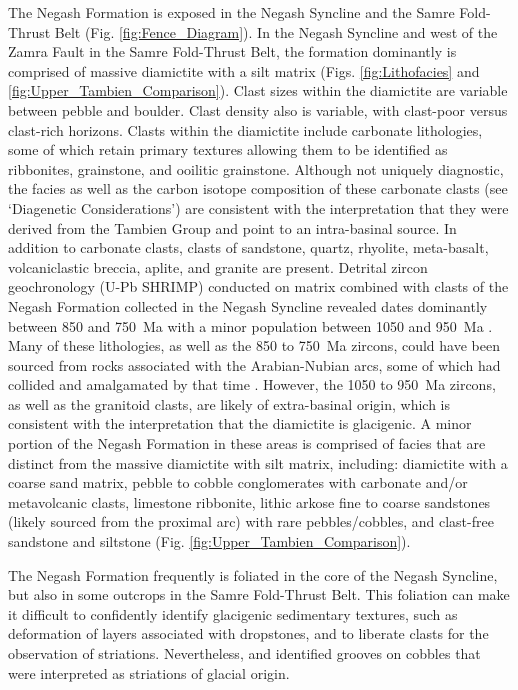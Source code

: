 \documentclass[11pt,letterpaper]{article}
\begin{document}
The Negash Formation is exposed in the Negash Syncline and the Samre Fold-Thrust Belt (Fig. \ref{fig:Fence_Diagram}). In the Negash Syncline and west of the Zamra Fault in the Samre Fold-Thrust Belt, the formation dominantly is comprised of massive diamictite with a silt matrix (Figs. \ref{fig:Lithofacies} and \ref{fig:Upper_Tambien_Comparison}). Clast sizes within the diamictite are variable between pebble and boulder. Clast density also is variable, with clast-poor versus clast-rich horizons. Clasts within the diamictite include carbonate lithologies, some of which retain primary textures allowing them to be identified as ribbonites, grainstone, and ooilitic grainstone. Although not uniquely diagnostic, the facies as well as the carbon isotope composition of these carbonate clasts (see `Diagenetic Considerations') are consistent with the interpretation that they were derived from the Tambien Group and point to an intra-basinal source. In addition to carbonate clasts, clasts of sandstone, quartz, rhyolite, meta-basalt, volcaniclastic breccia, aplite, and granite are present. Detrital zircon geochronology (U-Pb SHRIMP) conducted on matrix combined with clasts of the Negash Formation collected in the Negash Syncline revealed dates dominantly between 850 and 750~Ma with a minor population between 1050 and 950~Ma \citep{Avigad2007a}. Many of these lithologies, as well as the 850 to 750~Ma zircons, could have been sourced from rocks associated with the Arabian-Nubian arcs, some of which had collided and amalgamated by that time \citep{Johnson2014a}. However, the 1050 to 950~Ma zircons, as well as the granitoid clasts, are likely of extra-basinal origin, which is consistent with the interpretation that the diamictite is glacigenic. A minor portion of the Negash Formation in these areas is comprised of facies that are distinct from the massive diamictite with silt matrix, including: diamictite with a coarse sand matrix, pebble to cobble conglomerates with carbonate and/or metavolcanic clasts, limestone ribbonite, lithic arkose fine to coarse sandstones (likely sourced from the proximal arc) with rare pebbles/cobbles, and clast-free sandstone and siltstone (Fig. \ref{fig:Upper_Tambien_Comparison}).

The Negash Formation frequently is foliated in the core of the Negash Syncline, but also in some outcrops in the Samre Fold-Thrust Belt. This foliation can make it difficult to confidently identify glacigenic sedimentary textures, such as deformation of layers associated with dropstones, and to liberate clasts for the observation of striations. Nevertheless, \citet{MacLennan2018a} and \citet{Miller2003a} identified grooves on cobbles that were interpreted as striations of glacial origin.
\end{document}
